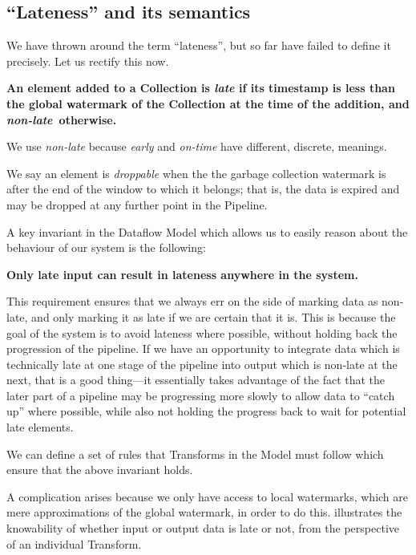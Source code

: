 \subsection{``Lateness'' and its semantics}\label{sec:impl:dataflow:lateness}

We have thrown around the term ``lateness'', but so far have failed to define it precisely.
Let us rectify this now.


\textbf{An element added to a Collection is \emph{late} if its timestamp is less than the global watermark of the Collection at the time of the addition, and \emph{non-late}\footnotemark\ otherwise.}

\footnotetext
{
We use \emph{non-late} because \emph{early} and \emph{on-time} have different, discrete, meanings.
}

We say an element is \emph{droppable} when the the garbage collection watermark is after the end of the window to which it belongs; that is, the data is expired and may be dropped at any further point in the Pipeline.

A key invariant in the Dataflow Model which allows us to easily reason about the behaviour of our system is the following:

\textbf{Only late input can result in lateness anywhere in the system.}

This requirement ensures that we always err on the side of marking data as non-late, and only marking it as late if we are certain that it is.
This is because the goal of the system is to avoid lateness where possible, without holding back the progression of the pipeline.
If we have an opportunity to integrate data which is technically late at one stage of the pipeline into output which is non-late at the next, that is a good thing---it essentially takes advantage of the fact that the later part of a pipeline may be progressing more slowly to allow data to ``catch up'' where possible, while also not holding the progress back to wait for potential late elements.

We can define a set of rules that Transforms in the Model must follow which ensure that the above invariant holds.

A complication arises because we only have access to local watermarks, which are mere approximations of the global watermark, in order to do this.
 illustrates the knowability of whether input or output data is late or not, from the perspective of an individual Transform.

